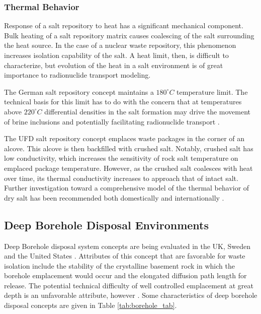 \subsubsection{Thermal Behavior}
\label{subsec:saltthermal}

Response of a salt repository to heat has a significant
mechanical component. Bulk heating of a salt repository matrix causes
coalescing  of the salt surrounding the heat source. In the case of a nuclear
waste repository, this phenomenon increases isolation capability of the salt. A
heat limit, then, is difficult to characterize, but evolution of the heat in a
salt environment is of great importance to radionuclide transport modeling. 

The German salt repository concept maintains a $180^\circ C$ temperature limit. 
The technical basis for this limit has to do with the concern that at
temperatures above $220^\circ C$ differential densities in the salt formation 
may drive the movement of brine inclusions and potentially facilitating radionuclide transport 
\cite{von_lensa_red-impact_2008, brewitz_long-term_2002, lee_preliminary_2012}. 

The \gls{UFD} salt repository concept emplaces waste packages in the corner of 
an alcove. This alcove is then backfilled with crushed salt. Notably, crushed 
salt has low conductivity, which increases the sensitivity of rock salt 
temperature on emplaced package temperature. However, as the crushed salt 
coalesces with heat over time, its thermal conductivity increases to approach that of 
intact salt. Further investigation toward a comprehensive model of the thermal 
behavior of dry salt has been recommended both domestically and internationally 
\cite{carter_disposal_2011}. 


\subsection{Deep Borehole Disposal Environments}

Deep Borehole disposal system concepts are being evaluated in the UK, 
Sweden and the United States \cite{von_lensa_red-impact_2008, 
clayton_generic_2011}. Attributes of this concept that are 
favorable for waste isolation include the stability of the crystalline 
basement rock in which the borehole emplacement would occur and the elongated
diffusion path length for release. The potential technical difficulty of well 
controlled emplacement at great depth is an unfavorable attribute, however 
\cite{hardin_generic_2011}.  Some characteristics of deep borehole disposal 
concepts are given in Table \ref{tab:borehole_tab}.   

